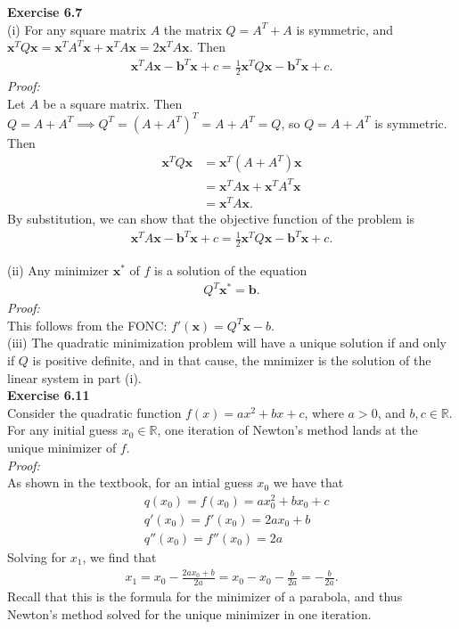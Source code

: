\documentclass[letterpaper,12pt]{article}
\let\vec\mathbf
\theoremstyle{definition}
\begin{document}
\textbf{Exercise 6.7} \\
(i) For any square matrix $A$ the matrix $Q = A^T + A$ is symmetric, and $\vec{x}^TQ\vec{x} = \vec{x}^TA^T\vec{x} + \vec{x}^TA\vec{x} = 2\vec{x}^TA\vec{x}$. Then
\begin{align*}
  \vec{x}^TA\vec{x} - \vec{b}^T\vec{x} + c = \frac{1}{2}\vec{x}^TQ\vec{x} - \vec{b}^T\vec{x} + c.
\end{align*}
\textit{Proof:} \\
Let $A$ be a square matrix. Then $Q = A + A^T \implies Q^T = (A + A^T)^T = A + A^T = Q$, so $Q = A + A^T$ is symmetric. Then
\begin{align*}
  \vec{x}^TQ\vec{x}
  &= \vec{x}^T(A + A^T)\vec{x} \\
  &= \vec{x}^TA\vec{x} + \vec{x}^TA^T\vec{x} \\
  &= \vec{x}^TA\vec{x}.
\end{align*}
By substitution, we can show that the objective function of the problem is
\begin{align*}
  \vec{x}^TA\vec{x} - \vec{b}^T\vec{x} + c = \frac{1}{2}\vec{x}^TQ\vec{x} - \vec{b}^T\vec{x} + c.
\end{align*}

(ii) Any minimizer $\vec{x}^*$ of $f$ is a solution of the equation
\begin{align*}
  Q^T\vec{x}^* = \vec{b}.
\end{align*}
\textit{Proof:} \\
This follows from the FONC: $f'(\vec{x})=Q^T\vec{x}-b$. \\

(iii) The quadratic minimization problem will have a unique solution if and only if $Q$ is positive definite, and in that cause, the mnimizer is the solution of the linear system in part (i). \\

\textbf{Exercise 6.11} \\
Consider the quadratic function $f(x)=ax^2+bx+c$, where $a>0$, and $b,c \in \mathbb{R}$. For any initial guess $x_0 \in \mathbb{R}$, one iteration of Newton's method lands at the unique minimizer of $f$.\\
\textit{Proof:} \\
As shown in the textbook, for an intial guess $x_0$ we have that
\begin{align*}
  & q(x_0) = f(x_0) = ax_0^2 + bx_0 + c \\
  & q'(x_0) = f'(x_0) = 2ax_0 + b \\
  & q''(x_0) = f''(x_0) = 2a
\end{align*}
Solving for $x_1$, we find that
\begin{align*}
  x_1 = x_0 - \frac{2ax_0 + b}{2a} = x_0 - x_0 - \frac{b}{2a} = - \frac{b}{2a}.
\end{align*}
Recall that this is the formula for the minimizer of a parabola, and thus Newton's method solved for the unique minimizer in one iteration. \\
\end{document}
